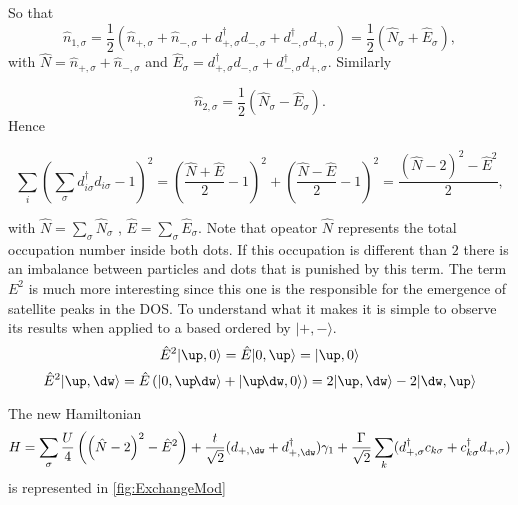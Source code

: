 So that 
\[\hat{n}_{1,\sigma}= \frac{1}{2} \left( \hat{n}_{+,\sigma} + \hat{n}_{-,\sigma} + d^\dagger_{+,\sigma}d_{-,\sigma} + d^\dagger_{-,\sigma}d_{+,\sigma} \right) = \frac{1}{2} \left( \hat{N}_\sigma + \hat{E}_\sigma \right),  \]
with $\hat{N} = \hat{n}_{+,\sigma} + \hat{n}_{-,\sigma}$ and $\hat{E}_\sigma = d^\dagger_{+,\sigma}d_{-,\sigma} + d^\dagger_{-,\sigma}d_{+,\sigma}. $ Similarly 

\[\hat{n}_{2,\sigma}= \frac{1}{2} \left( \hat{N}_\sigma - \hat{E}_\sigma \right).  \]
Hence 

\[\sum_{i} (\sum_{\sigma} d_{i \sigma}^{\dagger}d_{i \sigma}-1)^{2} = \left(\frac{\hat{N} +\hat{E}}{2}-1 \right) ^{2} + \left( \frac{\hat{N} -\hat{E}}{2}-1 \right)^{2} = \frac{\left( \hat{N}-2 \right)^2- \hat{E}^2}{2}, \]

with $\hat{N}=\sum_\sigma \hat{N}_\sigma $ , $\hat{E}=\sum_\sigma \hat{E}_\sigma $. Note that opeator $\hat{N}$ represents the total occupation number inside both dots. If this occupation is different than $2$ there is an imbalance between particles and dots that is punished by this term. The term $E^2$ is much more interesting since this one is the responsible for the emergence of satellite peaks in the DOS. To understand what it makes it is simple to observe its results when applied to a based ordered by $\vert + , - \rangle$. 
\[ \hat{E}^2 \vert \up , 0 \rangle =  \hat{E} \vert 0 , \up \rangle = \vert \up , 0 \rangle   \] 
\[ \hat{E}^2 \vert \up , \dw \rangle =  \hat{E} \left( \vert 0 , \up\!\dw \rangle + \vert \up\!\dw , 0 \rangle \right) = 2\vert \up , \dw \rangle - 2\vert \dw , \up \rangle  \]





The new Hamiltonian 
\begin{equation}
H = \sum_{\sigma}  \frac{U}{4}\left( \left( \hat{N}-2 \right)^2- \hat{E}^2 \right) + \frac{t}{\sqrt{2}} (d_{+,\dw}+d^\dagger_{+,\dw})\gamma_1 
 +  \frac{\Gamma}{\sqrt{2}}\sum_{ k}(d^\dagger_{+,\sigma}c_{k\sigma}+c^\dagger_{k\sigma}d_{+,\sigma})
\label{t+}
\end{equation}
is represented in \ref{fig:ExchangeMod}








